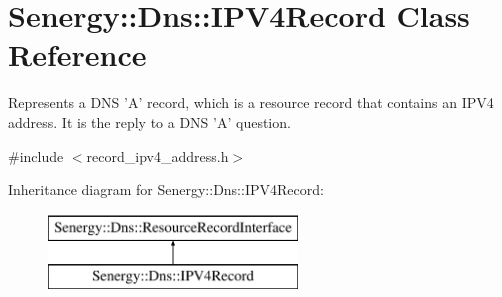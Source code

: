 \hypertarget{class_senergy_1_1_dns_1_1_i_p_v4_record}{\section{Senergy\-:\-:Dns\-:\-:I\-P\-V4\-Record Class Reference}
\label{class_senergy_1_1_dns_1_1_i_p_v4_record}
}


Represents a D\-N\-S 'A' record, which is a resource record that contains an I\-P\-V4 address. It is the reply to a D\-N\-S 'A' question.  




{\ttfamily \#include $<$record\-\_\-ipv4\-\_\-address.\-h$>$}

Inheritance diagram for Senergy\-:\-:Dns\-:\-:I\-P\-V4\-Record\-:\begin{figure}[H]
\begin{center}
\leavevmode
\includegraphics[height=2.000000cm]{class_senergy_1_1_dns_1_1_i_p_v4_record}
\end{center}
\end{figure}
